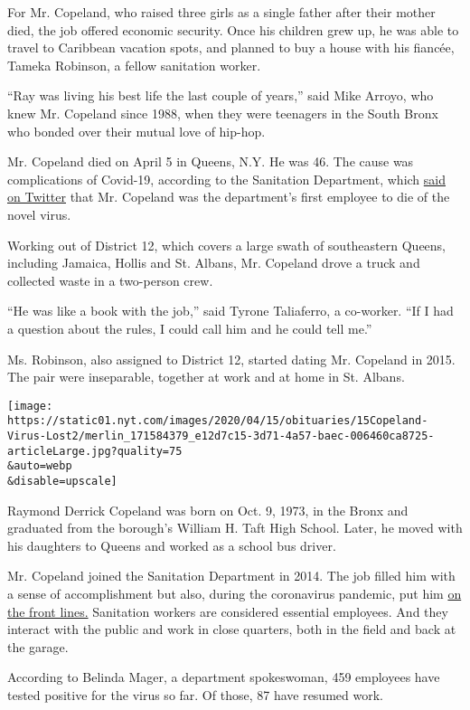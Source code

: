 For Mr. Copeland, who raised three girls as a single father after their
mother died, the job offered economic security. Once his children grew
up, he was able to travel to Caribbean vacation spots, and planned to
buy a house with his fiancée, Tameka Robinson, a fellow sanitation
worker.

``Ray was living his best life the last couple of years,'' said Mike
Arroyo, who knew Mr. Copeland since 1988, when they were teenagers in
the South Bronx who bonded over their mutual love of hip-hop.

Mr. Copeland died on April 5 in Queens, N.Y. He was 46. The cause was
complications of Covid-19, according to the Sanitation Department, which
\href{https://twitter.com/NYCSanitation/status/1247554105096224769}{said
on Twitter} that Mr. Copeland was the department's first employee to die
of the novel virus.

Working out of District 12, which covers a large swath of southeastern
Queens, including Jamaica, Hollis and St. Albans, Mr. Copeland drove a
truck and collected waste in a two-person crew.

``He was like a book with the job,'' said Tyrone Taliaferro, a
co-worker. ``If I had a question about the rules, I could call him and
he could tell me.''

Ms. Robinson, also assigned to District 12, started dating Mr. Copeland
in 2015. The pair were inseparable, together at work and at home in St.
Albans.

\texttt{[image: https://static01.nyt.com/images/2020/04/15/obituaries/15Copeland-Virus-Lost2/merlin\_171584379\_e12d7c15-3d71-4a57-baec-006460ca8725-articleLarge.jpg?quality=75\\\&auto=webp\\\&disable=upscale]}

Raymond Derrick Copeland was born on Oct. 9, 1973, in the Bronx and
graduated from the borough's William H. Taft High School. Later, he
moved with his daughters to Queens and worked as a school bus driver.

Mr. Copeland joined the Sanitation Department in 2014. The job filled
him with a sense of accomplishment but also, during the coronavirus
pandemic, put him
\href{https://www.nytimes.com/2020/03/30/opinion/coronavirus-worker-strike.html}{on
the front lines.} Sanitation workers are considered essential employees.
And they interact with the public and work in close quarters, both in
the field and back at the garage.

According to Belinda Mager, a department spokeswoman, 459 employees have
tested positive for the virus so far. Of those, 87 have resumed work.

